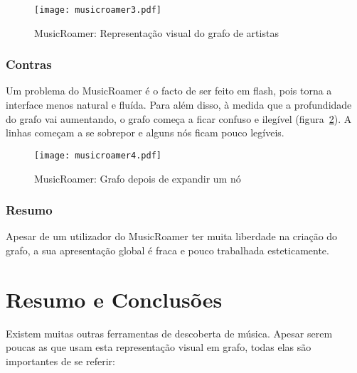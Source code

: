   \begin{figure}[tb]
    \begin{center}
      \texttt{[image: musicroamer3.pdf]}
    \end{center}
    \caption{MusicRoamer: Representação visual do grafo de artistas}
    \label{fig:sota_musicroamer3}
  \end{figure}


  \subsubsection{Contras} %
  \label{ssub:contras}

  Um problema do MusicRoamer é o facto de ser feito em flash, pois torna a interface menos natural e fluída.
  Para além disso, à medida que a profundidade do grafo vai aumentando, o grafo começa a ficar confuso e ilegível (figura~\ref{fig:sota_musicroamer4}).
  A linhas começam a se sobrepor e alguns nós ficam pouco legíveis.

  \begin{figure}[tb]
    \begin{center}
      \texttt{[image: musicroamer4.pdf]}
    \end{center}
    \caption{MusicRoamer: Grafo depois de expandir um nó}
    \label{fig:sota_musicroamer4}
  \end{figure}


  \subsubsection{Resumo} %
  \label{ssub:resumo}

  Apesar de um utilizador do MusicRoamer ter muita liberdade na criação do grafo, a sua apresentação global é fraca e pouco trabalhada esteticamente.
  





\section{Resumo e Conclusões}

Existem muitas outras ferramentas de descoberta de música. Apesar serem poucas as que usam esta representação visual em grafo, todas elas são importantes de se referir:

